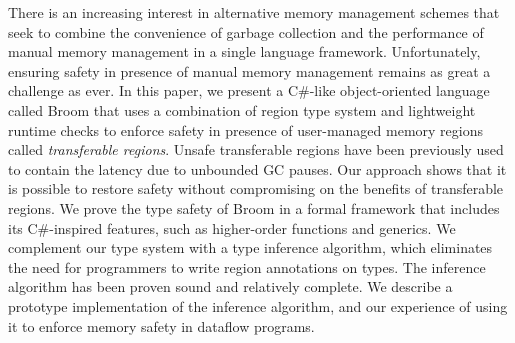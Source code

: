 There is an increasing interest in alternative memory management
schemes that seek to combine the convenience of garbage collection and
the performance of manual memory management in a single language
framework.  Unfortunately, ensuring safety in presence of manual
memory management remains as great a challenge as ever. In this paper,
we present a C\#-like object-oriented language called {\sc
Broom}\xspace that uses a combination of region type system and
lightweight runtime checks to enforce safety in presence of
user-managed memory regions called \emph{transferable regions}. Unsafe
transferable regions have been previously used to contain the latency
due to unbounded GC pauses. Our approach shows that it is possible to
restore safety without compromising on the benefits of transferable
regions.  We prove the type safety of {\sc Broom}\xspace in a formal
framework that includes its C\#-inspired features, such as
higher-order functions and generics. We complement our type system
with a type inference algorithm, which eliminates the need for
programmers to write region annotations on types. The inference
algorithm has been proven sound and relatively complete. We describe a
prototype implementation of the inference algorithm, and our
experience of using it to enforce memory safety in dataflow programs.

